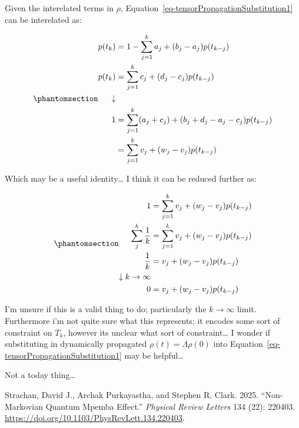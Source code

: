 \documentclass[
  letterpaper,
  DIV=11,
  numbers=noendperiod]{scrartcl}
\newlength{\cslhangindent}
\newenvironment{CSLReferences}[2] %
 {\begin{list}{}{%
  \setlength{\itemindent}{0pt}
  \setlength{\leftmargin}{0pt}
  \setlength{\parsep}{0pt}
  \ifodd #1
   \setlength{\leftmargin}{\cslhangindent}
   \setlength{\itemindent}{-1\cslhangindent}
  \fi
  \setlength{\itemsep}{#2\baselineskip}}}
 {\end{list}}
\begin{document}
Given the interelated terms in \(\rho\),
Equation~\ref{eq-tensorPropagationSubstitution1} can be interelated as:

\begin{equation}\phantomsection\label{eq-tensorPropagationSubstitution1_relation}{
\begin{align}
p(t_{k}) &= 1 - \sum_{j=1}^{k} a_{j}+(b_{j}-a_{j})p(t_{k-j}) \\ 
p(t_{k}) &=\sum_{j=1}^{k} c_{j}+(d_{j}-c_{j})p(t_{k-j}) \\
\downarrow \\
1&=\sum_{j=1}^{k}(a_{j}+c_{j})+(b_{j}+d_{j}-a_{j}-c_{j})p(t_{k-j}) \\
&= \sum_{j=1}^{k}v_{j}+(w_{j}-v_{j})p(t_{k-j})
\end{align}
}\end{equation}

Which may be a useful identity\ldots{} I think it can be reduced further
as:

\begin{equation}\phantomsection\label{eq-tensorPropagationSubstitution1_relationIdentity}{
\begin{align}
1&= \sum_{j=1}^{k}v_{j}+(w_{j}-v_{j})p(t_{k-j})\\
\sum_{j}^{k}\frac{1}{k} &= \sum_{j=1}^{k}v_{j}+(w_{j}-v_{j})p(t_{k-j}) \\
\frac{1}{k} &= v_{j}+(w_{j}-v_{j})p(t_{k-j}) \\
\downarrow k\to\infty \\
0 &= v_{j}+(w_{j}-v_{j})p(t_{k-j}) \\
\end{align}
}\end{equation}

I'm unsure if this is a valid thing to do; particularly the
\(k\to\infty\) limit. Furthermore i'm not quite sure what this
represents; it encodes some sort of constraint on \(T_{k}\), however its
unclear what sort of constraint\ldots{} I wonder if substituting in
dynamically propagated \(\rho(t)=\Lambda\rho(0)\) into
Equation~\ref{eq-tensorPropagationSubstitution1} may be helpful\ldots{}

Not a today thing\ldots{}

\label{refs}
\begin{CSLReferences}{1}{0}
Strachan, David J., Archak Purkayastha, and Stephen R. Clark. 2025.
{``Non-{Markovian} {Quantum} {Mpemba} {Effect}.''} \emph{Physical Review
Letters} 134 (22): 220403.
\url{https://doi.org/10.1103/PhysRevLett.134.220403}.

\end{CSLReferences}
\end{document}
